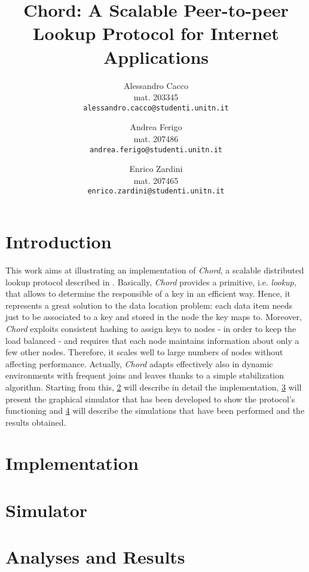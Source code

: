\documentclass[11pt,twocolumn,letterpaper]{article}
\begin{document}
	
	\title{Chord: A Scalable Peer-to-peer Lookup Protocol for Internet Applications}
	
	\author{Alessandro Cacco\\
		mat. 203345\\
		{\tt\small alessandro.cacco@studenti.unitn.it}
		\and
		Andrea Ferigo\\
		mat. 207486\\
		{\tt\small andrea.ferigo@studenti.unitn.it}
		\and
		Enrico Zardini\\
		mat. 207465\\
		{\tt\small enrico.zardini@studenti.unitn.it}
	}
	\date{}
	\maketitle
	
	\section{Introduction}
	\label{sec:intro}
	This work aims at illustrating an implementation of \textit{Chord}, a scalable distributed lookup protocol described in \cite{chord}. Basically, \textit{Chord} provides a primitive, i.e. \textit{lookup}, that allows to determine the responsible of a key in an efficient way. Hence, it represents a great solution to the data location problem: each data item needs just to be associated to a key and stored in the node the key maps to. \newline 
	Moreover, \textit{Chord} exploits consistent hashing to assign keys to nodes - in order to keep the load balanced - and requires that each node maintains information about only a few other nodes. Therefore, it scales well to large numbers of nodes  without affecting performance. Actually, \textit{Chord} adapts effectively also in dynamic environments with frequent joins and leaves thanks to a simple stabilization algorithm. \newline
	Starting from this, \cref{sec:implementation} will describe in detail the implementation, \cref{sec:simulator} will present the graphical simulator that has been developed to show the protocol's functioning and \cref{sec:analyses} will describe the simulations that have been performed and the results obtained. 
	
	\section{Implementation}
	\label{sec:implementation}
	
	\section{Simulator}
	\label{sec:simulator}
	
	\section{Analyses and Results}
	\label{sec:analyses}
	
	\printbibliography
\end{document}
